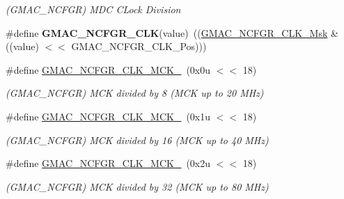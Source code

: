 \begin{DoxyCompactItemize}
\begin{DoxyCompactList}\small\item\em (G\+M\+A\+C\+\_\+\+N\+C\+F\+GR) M\+DC C\+Lock Division \end{DoxyCompactList}\item 
\mbox{\label{group__SAME70__GMAC_gae4247183dae9e114aa17becb809b847b}} 
\#define {\bfseries G\+M\+A\+C\+\_\+\+N\+C\+F\+G\+R\+\_\+\+C\+LK}(value)~((\mbox{\hyperlink{group__SAMV71__GMAC_ga54364bf4348097e2317950630b2fc53e}{G\+M\+A\+C\+\_\+\+N\+C\+F\+G\+R\+\_\+\+C\+L\+K\+\_\+\+Msk}} \& ((value) $<$$<$ G\+M\+A\+C\+\_\+\+N\+C\+F\+G\+R\+\_\+\+C\+L\+K\+\_\+\+Pos)))
\item 
\mbox{\label{group__SAME70__GMAC_ga8d13ce400afcd9fb73778d0e2752cc29}} 
\#define \mbox{\hyperlink{group__SAME70__GMAC_ga8d13ce400afcd9fb73778d0e2752cc29}{G\+M\+A\+C\+\_\+\+N\+C\+F\+G\+R\+\_\+\+C\+L\+K\+\_\+\+M\+C\+K\+\_}}~(0x0u $<$$<$ 18)
\begin{DoxyCompactList}\small\item\em (G\+M\+A\+C\+\_\+\+N\+C\+F\+GR) M\+CK divided by 8 (M\+CK up to 20 M\+Hz) \end{DoxyCompactList}\item 
\mbox{\label{group__SAME70__GMAC_gad6cc83200f34d4f307b7e9cd980abb77}} 
\#define \mbox{\hyperlink{group__SAME70__GMAC_gad6cc83200f34d4f307b7e9cd980abb77}{G\+M\+A\+C\+\_\+\+N\+C\+F\+G\+R\+\_\+\+C\+L\+K\+\_\+\+M\+C\+K\+\_}}~(0x1u $<$$<$ 18)
\begin{DoxyCompactList}\small\item\em (G\+M\+A\+C\+\_\+\+N\+C\+F\+GR) M\+CK divided by 16 (M\+CK up to 40 M\+Hz) \end{DoxyCompactList}\item 
\mbox{\label{group__SAME70__GMAC_ga24ba57f86aff162eda626c523b56a2d5}} 
\#define \mbox{\hyperlink{group__SAME70__GMAC_ga24ba57f86aff162eda626c523b56a2d5}{G\+M\+A\+C\+\_\+\+N\+C\+F\+G\+R\+\_\+\+C\+L\+K\+\_\+\+M\+C\+K\+\_}}~(0x2u $<$$<$ 18)
\begin{DoxyCompactList}\small\item\em (G\+M\+A\+C\+\_\+\+N\+C\+F\+GR) M\+CK divided by 32 (M\+CK up to 80 M\+Hz) \end{DoxyCompactList}\item 
\mbox{\label{group__SAME70__GMAC_gae867aa8a58afa86a0424e23e58c174c1}} 

\end{DoxyCompactItemize}
